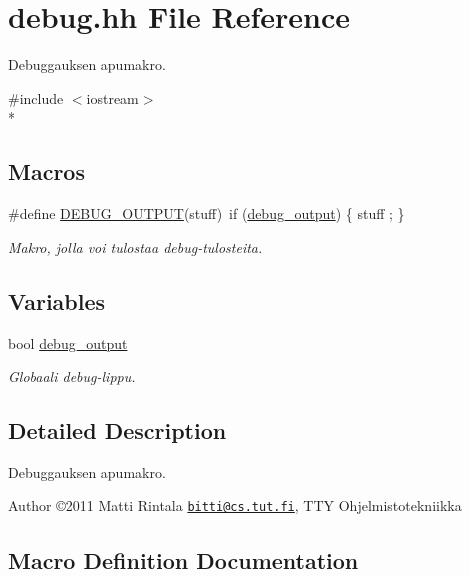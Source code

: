 \hypertarget{debug_8hh}{}\section{debug.\+hh File Reference}
\label{debug_8hh}


Debuggauksen apumakro.  


{\ttfamily \#include $<$iostream$>$}\\*
\subsection*{Macros}
\begin{DoxyCompactItemize}
\item 
\#define \hyperlink{debug_8hh_a3dad2c39ac6dc7758661440350fabb11}{D\+E\+B\+U\+G\+\_\+\+O\+U\+T\+P\+U\+T}(stuff)~if (\hyperlink{labyrintti_8cc_ab9eefb6ae2797c531d0b6e8c8264cdfa}{debug\+\_\+output}) \{  stuff ; \}
\begin{DoxyCompactList}\small\item\em Makro, jolla voi tulostaa debug-\/tulosteita. \end{DoxyCompactList}\end{DoxyCompactItemize}
\subsection*{Variables}
\begin{DoxyCompactItemize}
\item 
bool \hyperlink{debug_8hh_ab9eefb6ae2797c531d0b6e8c8264cdfa}{debug\+\_\+output}
\begin{DoxyCompactList}\small\item\em Globaali debug-\/lippu. \end{DoxyCompactList}\end{DoxyCompactItemize}


\subsection{Detailed Description}
Debuggauksen apumakro. 

\begin{DoxyAuthor}{Author}
©2011 Matti Rintala \href{mailto:bitti@cs.tut.fi}{\tt bitti@cs.\+tut.\+fi}, T\+T\+Y Ohjelmistotekniikka 
\end{DoxyAuthor}


\subsection{Macro Definition Documentation}
\hypertarget{debug_8hh_a3dad2c39ac6dc7758661440350fabb11}{}
